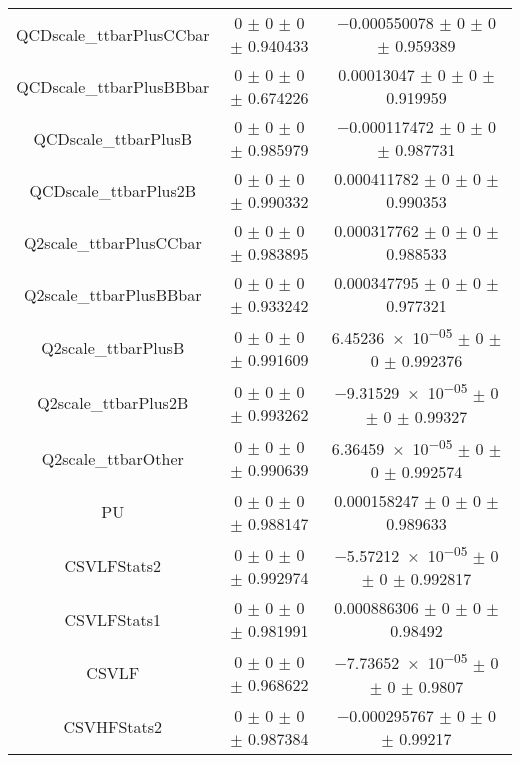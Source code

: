 \begin{table}
\begin{tabular}{ccc}
QCDscale\_ttbarPlusCCbar 	& \num{0} $\pm$ \num{0} $\pm$ \num{0} $\pm$ \num{0.940433} 	& \num{-0.000550078} $\pm$ \num{0} $\pm$ \num{0} $\pm$ \num{0.959389}\\
QCDscale\_ttbarPlusBBbar 	& \num{0} $\pm$ \num{0} $\pm$ \num{0} $\pm$ \num{0.674226} 	& \num{0.00013047} $\pm$ \num{0} $\pm$ \num{0} $\pm$ \num{0.919959}\\
QCDscale\_ttbarPlusB 	& \num{0} $\pm$ \num{0} $\pm$ \num{0} $\pm$ \num{0.985979} 	& \num{-0.000117472} $\pm$ \num{0} $\pm$ \num{0} $\pm$ \num{0.987731}\\
QCDscale\_ttbarPlus2B 	& \num{0} $\pm$ \num{0} $\pm$ \num{0} $\pm$ \num{0.990332} 	& \num{0.000411782} $\pm$ \num{0} $\pm$ \num{0} $\pm$ \num{0.990353}\\
Q2scale\_ttbarPlusCCbar 	& \num{0} $\pm$ \num{0} $\pm$ \num{0} $\pm$ \num{0.983895} 	& \num{0.000317762} $\pm$ \num{0} $\pm$ \num{0} $\pm$ \num{0.988533}\\
Q2scale\_ttbarPlusBBbar 	& \num{0} $\pm$ \num{0} $\pm$ \num{0} $\pm$ \num{0.933242} 	& \num{0.000347795} $\pm$ \num{0} $\pm$ \num{0} $\pm$ \num{0.977321}\\
Q2scale\_ttbarPlusB 	& \num{0} $\pm$ \num{0} $\pm$ \num{0} $\pm$ \num{0.991609} 	& \num{6.45236e-05} $\pm$ \num{0} $\pm$ \num{0} $\pm$ \num{0.992376}\\
Q2scale\_ttbarPlus2B 	& \num{0} $\pm$ \num{0} $\pm$ \num{0} $\pm$ \num{0.993262} 	& \num{-9.31529e-05} $\pm$ \num{0} $\pm$ \num{0} $\pm$ \num{0.99327}\\
Q2scale\_ttbarOther 	& \num{0} $\pm$ \num{0} $\pm$ \num{0} $\pm$ \num{0.990639} 	& \num{6.36459e-05} $\pm$ \num{0} $\pm$ \num{0} $\pm$ \num{0.992574}\\
PU 	& \num{0} $\pm$ \num{0} $\pm$ \num{0} $\pm$ \num{0.988147} 	& \num{0.000158247} $\pm$ \num{0} $\pm$ \num{0} $\pm$ \num{0.989633}\\
CSVLFStats2 	& \num{0} $\pm$ \num{0} $\pm$ \num{0} $\pm$ \num{0.992974} 	& \num{-5.57212e-05} $\pm$ \num{0} $\pm$ \num{0} $\pm$ \num{0.992817}\\
CSVLFStats1 	& \num{0} $\pm$ \num{0} $\pm$ \num{0} $\pm$ \num{0.981991} 	& \num{0.000886306} $\pm$ \num{0} $\pm$ \num{0} $\pm$ \num{0.98492}\\
CSVLF 	& \num{0} $\pm$ \num{0} $\pm$ \num{0} $\pm$ \num{0.968622} 	& \num{-7.73652e-05} $\pm$ \num{0} $\pm$ \num{0} $\pm$ \num{0.9807}\\
CSVHFStats2 	& \num{0} $\pm$ \num{0} $\pm$ \num{0} $\pm$ \num{0.987384} 	& \num{-0.000295767} $\pm$ \num{0} $\pm$ \num{0} $\pm$ \num{0.99217}\\

\end{tabular}
\end{table}
